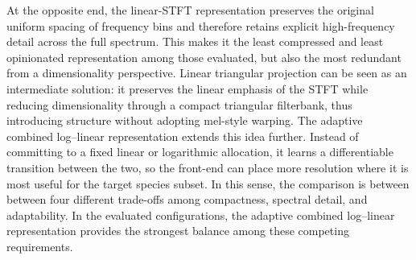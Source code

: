 \documentclass[a4paper,singleside,12pt]{report} %
\begin{document}
	At the opposite end, the linear-STFT representation preserves the original uniform spacing of frequency bins and therefore retains explicit high-frequency detail across the full spectrum. This makes it the least compressed and least opinionated representation among those evaluated, but also the most redundant from a dimensionality perspective. Linear triangular projection can be seen as an intermediate solution: it preserves the linear emphasis of the STFT while reducing dimensionality through a compact triangular filterbank, thus introducing structure without adopting mel-style warping. The adaptive combined log--linear representation extends this idea further. Instead of committing to a fixed linear or logarithmic allocation, it learns a differentiable transition between the two, so the front-end can place more resolution where it is most useful for the target species subset. In this sense, the comparison is between between four different trade-offs among compactness, spectral detail, and adaptability. In the evaluated configurations, the adaptive combined log--linear representation provides the strongest balance among these competing requirements.
\end{document}
